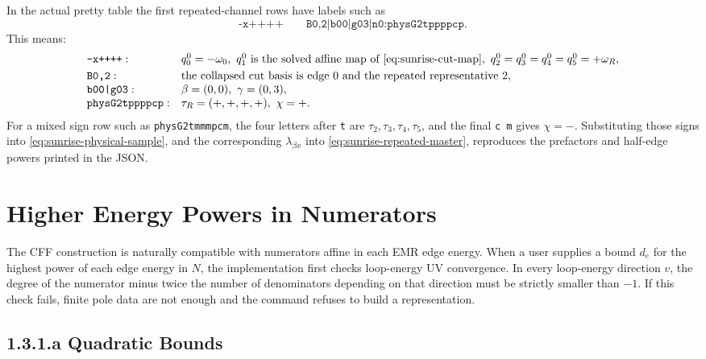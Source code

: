 \documentclass[11pt,a4paper]{report}
\begin{document}
In the actual pretty table the first repeated-channel rows have labels such as
\[
  \texttt{-x++++}\qquad
  \texttt{B0,2|b00|g03|n0:physG2tppppcp}.
\]
This means:
\[
\begin{array}{ll}
\texttt{-x++++}:&
q_0^0=-\omega_0,\ q_1^0 \hbox{ is the solved affine map of }
\eqref{eq:sunrise-cut-map},\
q_2^0=q_3^0=q_4^0=q_5^0=+\omega_R,\\[1mm]
\texttt{B0,2}:&\hbox{the collapsed cut basis is edge }0
\hbox{ and the repeated representative }2,\\
\texttt{b00|g03}:&\beta=(0,0),\ \gamma=(0,3),\\
\texttt{physG2tppppcp}:&
\tau_R=(+,+,+,+),\ \chi=+ .
\end{array}
\]
For a mixed sign row such as \texttt{physG2tmmmpcm}, the four letters after
\texttt{t} are \(\tau_2,\tau_3,\tau_4,\tau_5\), and the final
\texttt{c m} gives \(\chi=-\).  Substituting those signs into
\eqref{eq:sunrise-physical-sample}, and the corresponding
\(\lambda_{\beta x}\) into \eqref{eq:sunrise-repeated-master}, reproduces the
prefactors and half-edge powers printed in the JSON.

\section{Higher Energy Powers in Numerators}

The CFF construction is naturally compatible with numerators affine in each
EMR edge energy.  When a user supplies a bound \(d_e\) for the highest power of
each edge energy in \(N\), the implementation first checks loop-energy UV
convergence.  In every loop-energy direction \(v\), the degree of the numerator
minus twice the number of denominators depending on that direction must be
strictly smaller than \(-1\).  If this check fails, finite pole data are not
enough and the command refuses to build a representation.

\subsection*{1.3.1.a Quadratic Bounds}
\end{document}
